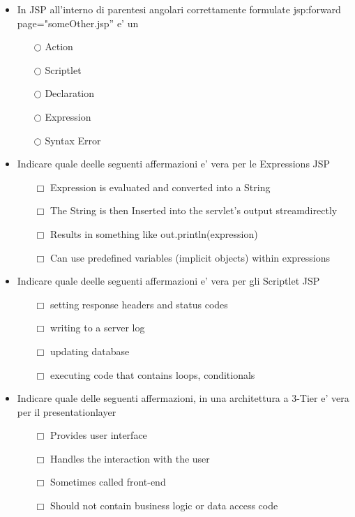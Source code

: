 \documentclass[10pt,twocolumn]{article}
\begin{document}
\begin{itemize}
    \item In JSP all'interno di parentesi angolari correttamente formulate jsp:forward page="someOther.jsp” e' un
          \begin{itemize}
              \item[$\bigcirc$] Action
              \item[$\bigcirc$] Scriptlet
              \item[$\bigcirc$] Declaration
              \item[$\bigcirc$] Expression
              \item[$\bigcirc$] Syntax Error
          \end{itemize}
\end{itemize}
\begin{itemize}
    \item Indicare quale deelle seguenti affermazioni e' vera per le Expressions JSP
          \begin{itemize}
              \item[$\Box$] Expression is evaluated and converted into a String
              \item[$\Box$] The String is then Inserted into the servlet's output streamdirectly
              \item[$\Box$] Results in something like out.println(expression)
              \item[$\Box$] Can use predefined variables (implicit objects) within expressions
          \end{itemize}
\end{itemize}
\begin{itemize}
    \item Indicare quale deelle seguenti affermazioni e' vera per gli Scriptlet JSP
          \begin{itemize}
              \item[$\Box$] setting response headers and status codes
              \item[$\Box$] writing to a server log
              \item[$\Box$] updating database
              \item[$\Box$] executing code that contains loops, conditionals
          \end{itemize}
\end{itemize}
\begin{itemize}
    \item Indicare quale delle seguenti affermazioni, in una architettura a 3-Tier e' vera per il presentationlayer
          \begin{itemize}
              \item[$\Box$] Provides user interface
              \item[$\Box$] Handles the interaction with the user
              \item[$\Box$] Sometimes called front-end
              \item[$\Box$] Should not contain business logic or data access code
          \end{itemize}
\end{itemize}
\end{document}
